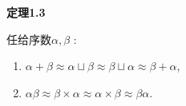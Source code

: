 \documentclass[UTF8]{ctexart}
\begin{document}
\vspace{30pt}

\hypertarget{sec:定理1.3}{}
\noindent\textbf{定理1.3}

任给序数$\alpha,\beta$ :
\begin{enumerate}
    \item $\alpha+\beta\approx\alpha\sqcup\beta\approx
    \beta\sqcup\alpha\approx\beta+\alpha$,
    \item $\alpha\beta\approx\beta\times\alpha\approx
    \alpha\times\beta\approx\beta\alpha$.
\end{enumerate}
\end{document}
